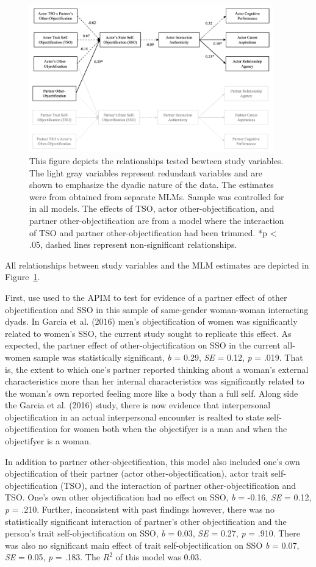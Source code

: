 \documentclass[man]{apa6}
\begin{document}
\begin{figure}
\includegraphics[width=400px]{figures/SEMfigure} \caption{This figure depicts the relationships tested bewteen study variables. The light gray variables represent redundant variables and are shown to emphasize the dyadic nature of the data. The estimates were from obtained from separate MLMs. Sample was controlled for in all models. The effects of TSO, actor other-objectification, and partner other-objectification are from a model where the interaction of TSO and partner other-objectification had been trimmed. *p < .05, dashed lines represent non-significant relationships.}\label{fig:semfigure}
\end{figure}

All relationships between study variables and the MLM estimates are
depicted in Figure~\ref{fig:semfigure}.

First, use used to the APIM to test for evidence of a partner effect of
other objectification and SSO in this sample of same-gender woman-woman
interacting dyads. In Garcia et al. (2016) men's objectification of
women was significantly related to women's SSO, the current study sought
to replicate this effect. As expected, the partner effect of
other-objectification on SSO in the current all-women sample was
statistically significant, \emph{b} = 0.29, \emph{SE} = 0.12, \emph{p} =
.019. That is, the extent to which one's partner reported thinking about
a woman's external characteristics more than her internal
characteristics was significantly related to the woman's own reported
feeling more like a body than a full self. Along side the Garcia et al.
(2016) study, there is now evidence that interpersonal objectification
in an actual interpersonal encounter is realted to state
self-objectification for women both when the objectifyer is a man and
when the objectifyer is a woman.

In addition to partner other-objectification, this model also included
one's own objectification of their partner (actor
other-objectification), actor trait self-objectification (TSO), and the
interaction of partner other-objectification and TSO. One's own other
objectification had no effect on SSO, \emph{b} = -0.16, \emph{SE} =
0.12, \emph{p} = .210. Further, inconsistent with past findings however,
there was no statistically significant interaction of partner's other
objectification and the person's trait self-objectification on SSO,
\emph{b} = 0.03, \emph{SE} = 0.27, \emph{p} = .910. There was also no
significant main effect of trait self-objectification on SSO \emph{b} =
0.07, \emph{SE} = 0.05, \emph{p} = .183. The \(R^2\) of this model was
0.03.
\end{document}
